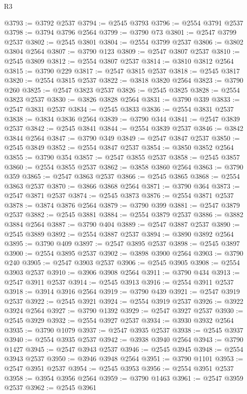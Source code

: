 \begin{lexlean}{R3}
\begin{coremodule}
@3793 := @3792 @2537
@3794 := @2545 @3793
@3796 := @2554 @3791 @2537
@3798 := @3794 @3796 @2564
@3799 := @3790 @73
@3801 := @2547 @3799 @2537
@3802 := @2545 @3801
@3804 := @2554 @3799 @2537
@3806 := @3802 @3804 @2564
@3807 := @3790 @123
@3809 := @2547 @3807 @2537
@3810 := @2545 @3809
@3812 := @2554 @3807 @2537
@3814 := @3810 @3812 @2564
@3815 := @3790 @229
@3817 := @2547 @3815 @2537
@3818 := @2545 @3817
@3820 := @2554 @3815 @2537
@3822 := @3818 @3820 @2564
@3823 := @3790 @260
@3825 := @2547 @3823 @2537
@3826 := @2545 @3825
@3828 := @2554 @3823 @2537
@3830 := @3826 @3828 @2564
@3831 := @3790 @339
@3833 := @2547 @3831 @2537
@3834 := @2545 @3833
@3836 := @2554 @3831 @2537
@3838 := @3834 @3836 @2564
@3839 := @3790 @344
@3841 := @2547 @3839 @2537
@3842 := @2545 @3841
@3844 := @2554 @3839 @2537
@3846 := @3842 @3844 @2564
@3847 := @3790 @349
@3849 := @2547 @3847 @2537
@3850 := @2545 @3849
@3852 := @2554 @3847 @2537
@3854 := @3850 @3852 @2564
@3855 := @3790 @354
@3857 := @2547 @3855 @2537
@3858 := @2545 @3857
@3860 := @2554 @3855 @2537
@3862 := @3858 @3860 @2564
@3863 := @3790 @359
@3865 := @2547 @3863 @2537
@3866 := @2545 @3865
@3868 := @2554 @3863 @2537
@3870 := @3866 @3868 @2564
@3871 := @3790 @364
@3873 := @2547 @3871 @2537
@3874 := @2545 @3873
@3876 := @2554 @3871 @2537
@3878 := @3874 @3876 @2564
@3879 := @3790 @399
@3881 := @2547 @3879 @2537
@3882 := @2545 @3881
@3884 := @2554 @3879 @2537
@3886 := @3882 @3884 @2564
@3887 := @3790 @404
@3889 := @2547 @3887 @2537
@3890 := @2545 @3889
@3892 := @2554 @3887 @2537
@3894 := @3890 @3892 @2564
@3895 := @3790 @409
@3897 := @2547 @3895 @2537
@3898 := @2545 @3897
@3900 := @2554 @3895 @2537
@3902 := @3898 @3900 @2564
@3903 := @3790 @240
@3905 := @2547 @3903 @2537
@3906 := @2545 @3905
@3908 := @2554 @3903 @2537
@3910 := @3906 @3908 @2564
@3911 := @3790 @434
@3913 := @2547 @3911 @2537
@3914 := @2545 @3913
@3916 := @2554 @3911 @2537
@3918 := @3914 @3916 @2564
@3919 := @3790 @439
@3921 := @2547 @3919 @2537
@3922 := @2545 @3921
@3924 := @2554 @3919 @2537
@3926 := @3922 @3924 @2564
@3927 := @3790 @1392
@3929 := @2547 @3927 @2537
@3930 := @2545 @3929
@3932 := @2554 @3927 @2537
@3934 := @3930 @3932 @2564
@3935 := @3790 @1079
@3937 := @2547 @3935 @2537
@3938 := @2545 @3937
@3940 := @2554 @3935 @2537
@3942 := @3938 @3940 @2564
@3943 := @3790 @1427
@3945 := @2547 @3943 @2537
@3946 := @2545 @3945
@3948 := @2554 @3943 @2537
@3950 := @3946 @3948 @2564
@3951 := @3790 @1101
@3953 := @2547 @3951 @2537
@3954 := @2545 @3953
@3956 := @2554 @3951 @2537
@3958 := @3954 @3956 @2564
@3959 := @3790 @1463
@3961 := @2547 @3959 @2537
@3962 := @2545 @3961

\end{coremodule}
\end{lexlean}
